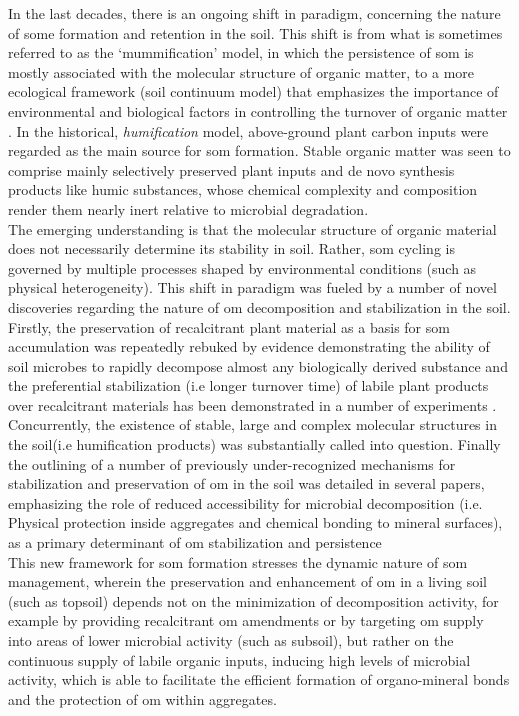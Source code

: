 	 In the last  decades, there is an ongoing shift in  paradigm, concerning the nature of \gls{some} formation and retention in the soil. This shift is from what is sometimes referred to as the ‘mummification’ model, in which the persistence of \gls{som} is mostly associated with the molecular structure of organic matter, to a more ecological framework (soil continuum model) that emphasizes the importance of environmental and biological factors in controlling the turnover of organic matter \citep{lehmann2015}. In the historical, \textit{humification} model, above-ground plant carbon inputs were regarded as the main source for \gls{som} formation. Stable organic matter was seen to comprise mainly selectively preserved plant inputs and de novo synthesis products like humic substances, whose chemical complexity and composition render them nearly inert relative to microbial degradation.\\
	 The emerging understanding is that the molecular structure of organic material does not necessarily determine its stability in soil. Rather, \gls{som} cycling is governed by multiple processes shaped by environmental conditions (such as physical heterogeneity)\citep{schmidt2011c}. This shift in paradigm was fueled by a number of novel discoveries regarding the nature of \gls{om} decomposition and stabilization in the soil. Firstly, the preservation of recalcitrant plant material as a basis for \gls{som} accumulation was repeatedly rebuked by evidence demonstrating the ability of soil microbes to rapidly decompose almost any biologically derived substance \citep{dungait2012, marschner2008} and the preferential stabilization (i.e longer turnover time) of labile plant products over recalcitrant materials has been demonstrated in a number of experiments \citep{cotrufo2013, kleber2011}. Concurrently, the existence of stable, large and complex molecular structures in the soil(i.e humification products) was substantially called into question\citep{kleber2010}. Finally the outlining of a number of previously under-recognized mechanisms for stabilization and preservation of \gls{om} in the soil was detailed in several papers, emphasizing the role of reduced accessibility for microbial decomposition (i.e. Physical protection inside aggregates and chemical bonding to mineral surfaces), as a primary determinant of \gls{om} stabilization and persistence\citep{lutzow2006, lutzow2008, ekschmitt2008}\.\\
	 This new framework for \gls{som} formation stresses the dynamic nature of \gls{som} management, wherein the preservation and enhancement of \gls{om} in a living soil (such as topsoil) depends not on the minimization of decomposition activity, for example by providing recalcitrant \gls{om} amendments or by targeting \gls{om} supply into areas of lower microbial activity (such as subsoil), but rather on the continuous supply of labile organic inputs, inducing high levels of microbial activity, which is able to facilitate the efficient formation of organo-mineral bonds and the protection of \gls{om} within aggregates\citep{dungait2012,barre2016,basler2015}.


